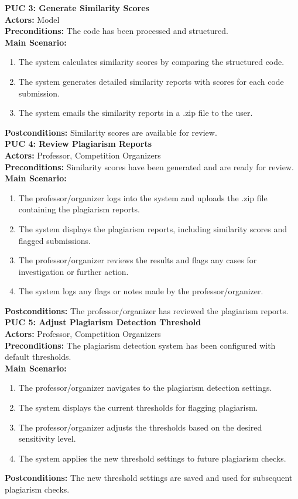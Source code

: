 \documentclass[12pt]{article}
\begin{document}
\textbf{PUC 3: Generate Similarity Scores}\\
\textbf{Actors:} Model\\
\textbf{Preconditions:} The code has been processed and structured.\\
\textbf{Main Scenario:}
\begin{enumerate}
    \item The system calculates similarity scores by comparing the structured code.
    \item The system generates detailed similarity reports with scores for each code submission.
    \item The system emails the similarity reports in a .zip file to the user.
\end{enumerate}
\textbf{Postconditions:} Similarity scores are available for review.\\[0.2cm]

\textbf{PUC 4: Review Plagiarism Reports}\\
\textbf{Actors:} Professor, Competition Organizers\\
\textbf{Preconditions:} Similarity scores have been generated and are ready for review.\\
\textbf{Main Scenario:}
\begin{enumerate}
    \item The professor/organizer logs into the system and uploads the .zip file containing the plagiarism reports.
    \item The system displays the plagiarism reports, including similarity scores and flagged submissions.
    \item The professor/organizer reviews the results and flags any cases for investigation or further action.
    \item The system logs any flags or notes made by the professor/organizer.
\end{enumerate}
\textbf{Postconditions:} The professor/organizer has reviewed the plagiarism reports.\\[0.2cm]

\textbf{PUC 5: Adjust Plagiarism Detection Threshold}\\
\textbf{Actors:} Professor, Competition Organizers\\
\textbf{Preconditions:} The plagiarism detection system has been configured with default thresholds.\\
\textbf{Main Scenario:}
\begin{enumerate}
    \item The professor/organizer navigates to the plagiarism detection settings.
    \item The system displays the current thresholds for flagging plagiarism.
    \item The professor/organizer adjusts the thresholds based on the desired sensitivity level.
    \item The system applies the new threshold settings to future plagiarism checks.
\end{enumerate}
\textbf{Postconditions:} The new threshold settings are saved and used for subsequent plagiarism checks.\\[0.2cm]
\end{document}
